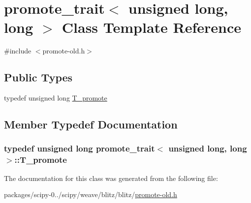 \hypertarget{classpromote__trait_3_01unsigned_01long_00_01long_01_4}{}\section{promote\+\_\+trait$<$ unsigned long, long $>$ Class Template Reference}
\label{classpromote__trait_3_01unsigned_01long_00_01long_01_4}


{\ttfamily \#include $<$promote-\/old.\+h$>$}

\subsection*{Public Types}
\begin{DoxyCompactItemize}
\item 
typedef unsigned long \hyperlink{classpromote__trait_3_01unsigned_01long_00_01long_01_4_ab54e24a2213b9dc711f6a69e40a24584}{T\+\_\+promote}
\end{DoxyCompactItemize}


\subsection{Member Typedef Documentation}
\hypertarget{classpromote__trait_3_01unsigned_01long_00_01long_01_4_ab54e24a2213b9dc711f6a69e40a24584}{}
\subsubsection[{T\+\_\+promote}]{\setlength{\rightskip}{0pt plus 5cm}typedef unsigned long {\bf promote\+\_\+trait}$<$ unsigned long, long $>$\+::{\bf T\+\_\+promote}}\label{classpromote__trait_3_01unsigned_01long_00_01long_01_4_ab54e24a2213b9dc711f6a69e40a24584}


The documentation for this class was generated from the following file\+:\begin{DoxyCompactItemize}
\item 
packages/scipy-\/0../scipy/weave/blitz/blitz/\hyperlink{promote-old_8h}{promote-\/old.\+h}\end{DoxyCompactItemize}
